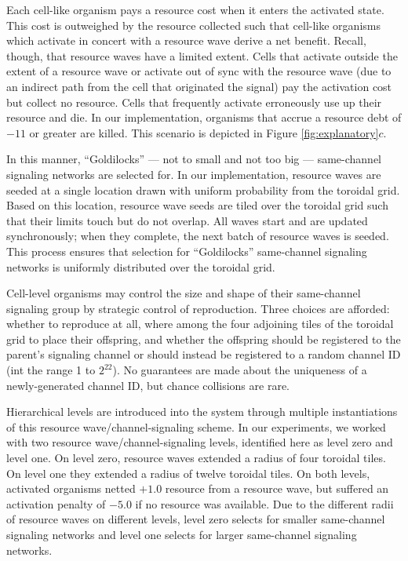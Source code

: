 Each cell-like organism pays a resource cost when it enters the activated state.
This cost is outweighed by the resource collected such that cell-like organisms which activate in concert with a resource wave derive a net benefit.
Recall, though, that resource waves have a limited extent.
Cells that activate outside the extent of a resource wave or activate out of sync with the resource wave (due to an indirect path from the cell that originated the signal) pay the activation cost but collect no resource.
Cells that frequently activate erroneously use up their resource and die.
In our implementation, organisms that accrue a resource debt of $-11$ or greater are killed.
This scenario is depicted in Figure \ref{fig:explanatory}$c$.

In this manner, ``Goldilocks'' --- not to small and not too big --- same-channel signaling networks are selected for.
In our implementation, resource waves are seeded at a single location drawn  with uniform probability from the toroidal grid.
Based on this location, resource wave seeds are tiled over the toroidal grid such that their limits touch but do not overlap.
All waves start and are updated synchronously;
when they complete, the next batch of resource waves is seeded.
This process ensures that selection for ``Goldilocks'' same-channel signaling networks is uniformly distributed over the toroidal grid.

Cell-level organisms may control the size and shape of their same-channel signaling group by strategic control of reproduction.
Three choices are afforded: whether to reproduce at all, where among the four adjoining tiles of the toroidal grid to place their offspring, and whether the offspring should be registered to the parent's signaling channel or should instead be registered to a random channel ID (int the range 1 to $2^{22}$).
No guarantees are made about the uniqueness of a newly-generated channel ID, but chance collisions are rare.

Hierarchical levels are introduced into the system through multiple instantiations of this resource wave/channel-signaling scheme.
In our experiments, we worked with two resource wave/channel-signaling levels, identified here as level zero and level one.
On level zero, resource waves extended a radius of four toroidal tiles.
On level one they extended a radius of twelve toroidal tiles.
On both levels, activated organisms netted $+1.0$ resource from a resource wave, but suffered an activation penalty of $-5.0$ if no resource was available.
Due to the different radii of resource waves on different levels, level zero selects for smaller same-channel signaling networks and level one selects for larger same-channel signaling networks.

